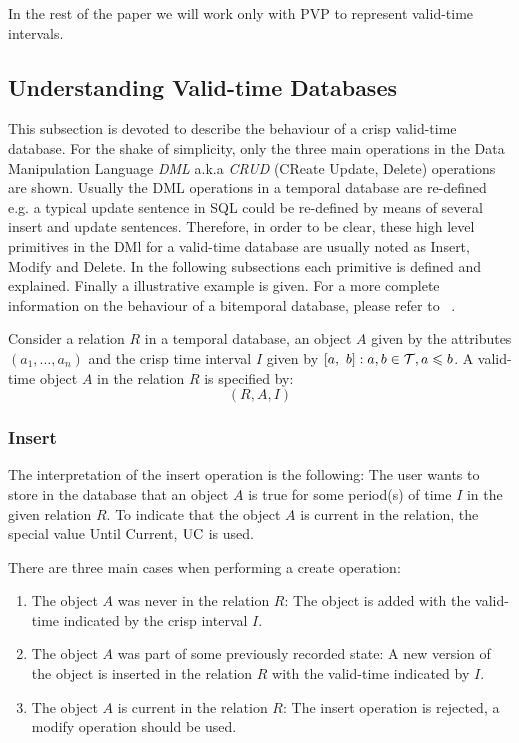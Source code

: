 In the rest of the paper we will work only with PVP to represent valid-time intervals.


\subsection{Understanding Valid-time Databases}
This subsection is devoted to describe the behaviour of a crisp valid-time database. For the shake of simplicity, only the three main operations in the Data Manipulation Language \emph{DML} a.k.a \emph{CRUD} (CReate Update, Delete) operations are shown. Usually the DML operations in a temporal database are re-defined e.g. a typical update sentence in SQL could be re-defined by means of several insert and update sentences. Therefore, in order to be clear, these high level primitives in the DMl for a valid-time database are usually noted as Insert, Modify and Delete. In the following subsections each primitive is defined and explained. Finally a illustrative example is given. For a more complete information on the behaviour of a bitemporal database, please refer to ~\cite{Jensen1994}.

\begin{definition}
Consider a relation $R$ in a temporal database, an object $A$ given by the attributes $\left(a_1, \ldots, a_n \right)$ and the crisp time interval $I$ given by $\left[a,\ b\right] : a,b \in \mathcal{T}, a \leqslant b$. A valid-time object $A$ in the relation $R$ is specified by:
\begin{equation}
\label{eq:rel-def}
\left( R, A , I \right)
\end{equation}
\end{definition}

\subsubsection{Insert}
The interpretation of the insert operation is the following: The user wants to store in the database that an object $A$  is true for some period(s) of time $I$ in the given relation $R$. To indicate that the object $A$ is current in the relation, the special value Until Current, $\operatorname{UC}$  is used. 

There are three main cases when performing a create operation:
\begin{enumerate}
\item The object $A$ was never in the relation $R$: The object is added with the valid-time indicated by the crisp interval $I$.

\item The object $A$ was part of some previously recorded state: A new version of the object is inserted in the relation $R$ with the valid-time indicated by $I$.

\item The object $A$ is current in the relation $R$: The insert operation is rejected, a modify operation should be used.
\end{enumerate}

